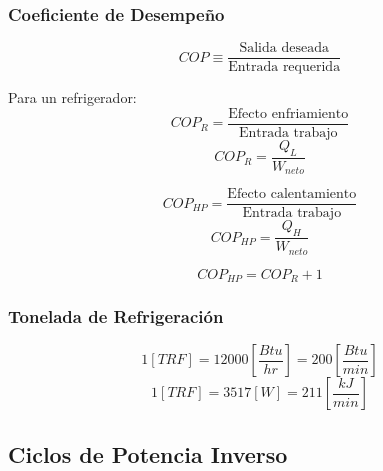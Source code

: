         \begin{quote}
        \end{quote}
        
        \subsubsection{Coeficiente de Desempeño}
        
        \[COP \equiv \frac{\text{Salida deseada}}{\text{Entrada requerida}}\]
        
        Para un refrigerador:
        \[{COP}_{R}= \frac{\text{Efecto enfriamiento}}{\text{Entrada trabajo}}\]
        \[{COP}_{R}=\frac{Q_{L}}{W_{neto}}\]
        
        \[{COP}_{HP}=\frac{\text{Efecto calentamiento}}{\text{Entrada trabajo}}\]
        \[{COP}_{HP}=\frac{Q_{H}}{W_{neto}}\]
        
        \begin{equation}
        \label{cop_equiv}
            {COP}_{HP}={COP}_{R} + 1
        \end{equation}
        
        \subsubsection{Tonelada de Refrigeración}
        
        \begin{quote}
        \end{quote}
        
        \begin{quote}
        \end{quote}
        
        \[1 [TRF] = 12000 \left[ \frac{Btu}{hr} \right ] = 200 \left[ \frac{Btu}{min} \right ]\]
        \[1 [TRF] = 3517 [W] = 211 \left[ \frac{kJ}{min} \right ]\]

    \subsection{Ciclos de Potencia Inverso}
    
